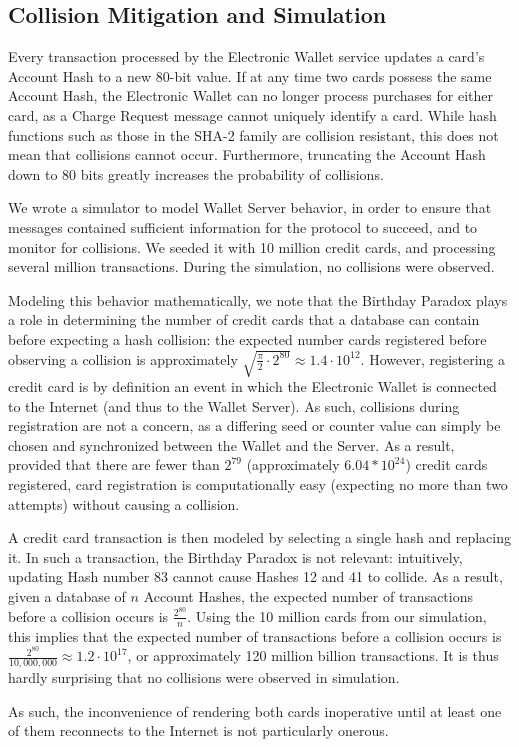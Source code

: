 \subsection{Collision Mitigation and Simulation}
\label{sec:collisions_and_simulations}

Every transaction processed by the Electronic Wallet service updates a card's Account Hash to a new 80-bit value.
If at any time two cards possess the same Account Hash, the Electronic Wallet can no longer process purchases for either card, as a Charge Request message cannot uniquely identify a card.
While hash functions such as those in the SHA-2 family are collision resistant, this does not mean that collisions cannot occur.
Furthermore, truncating the Account Hash down to 80 bits greatly increases the probability of collisions.

We wrote a simulator to model Wallet Server behavior, in order to ensure that messages contained sufficient information for the protocol to succeed, and to monitor for collisions.
We seeded it with 10 million credit cards, and processing several million transactions.
During the simulation, no collisions were observed.

Modeling this behavior mathematically, we note that the Birthday Paradox plays a role in determining the number of credit cards that a database can contain before expecting a hash collision:
the expected number cards registered before observing a collision is approximately
$\sqrt{\frac{\pi}{2} \cdot 2^{80}} \approx 1.4 \cdot 10^{12}$.
However, registering a credit card is by definition an event in which the Electronic Wallet is connected to the Internet (and thus to the Wallet Server).
As such, collisions during registration are not a concern, as a differing seed or counter value can simply be chosen and synchronized between the Wallet and the Server.
As a result, provided that there are fewer than $2^{79}$ (approximately $6.04 * 10^{24}$) credit cards registered, card registration is computationally easy (expecting no more than two attempts) without causing a collision.

A credit card transaction is then modeled by selecting a single hash and replacing it.
In such a transaction, the Birthday Paradox is not relevant:
intuitively, updating Hash number 83 cannot cause Hashes 12 and 41 to collide.
As a result, given a database of $n$ Account Hashes, the expected number of transactions before a collision occurs is
$\frac{2^{80}}{n}$.
Using the 10 million cards from our simulation, this implies that the expected number of transactions before a collision occurs is
$\frac{2^{80}}{10,000,000} \approx 1.2 \cdot 10 ^ {17}$, or approximately 120 million billion transactions.
It is thus hardly surprising that no collisions were observed in simulation.

As such, the inconvenience of rendering both cards inoperative until at least one of them reconnects to the Internet is not particularly onerous.